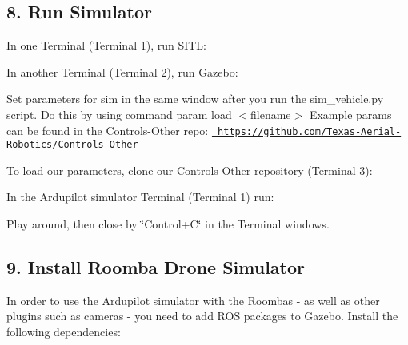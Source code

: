 \subsection*{8. Run Simulator}

In one Terminal (Terminal 1), run S\+I\+TL\+: 
\begin{DoxyCode}{0}
\end{DoxyCode}


In another Terminal (Terminal 2), run Gazebo\+: 
\begin{DoxyCode}{0}
\end{DoxyCode}


Set parameters for sim in the same window after you run the {\ttfamily sim\+\_\+vehicle.\+py script}. Do this by using command {\ttfamily param load $<$filename$>$} Example params can be found in the {\ttfamily Controls-\/\+Other} repo\+: \href{https://github.com/Texas-Aerial-Robotics/Controls-Other}{\texttt{ https\+://github.\+com/\+Texas-\/\+Aerial-\/\+Robotics/\+Controls-\/\+Other}}

To load our parameters, clone our {\ttfamily Controls-\/\+Other} repository (Terminal 3)\+: 
\begin{DoxyCode}{0}
\end{DoxyCode}
 In the Ardupilot simulator Terminal (Terminal 1) run\+: 
\begin{DoxyCode}{0}
\end{DoxyCode}
 Play around, then close by \char`\"{}\+Control+\+C\char`\"{} in the Terminal windows.

\subsection*{9. Install Roomba Drone Simulator}

In order to use the Ardupilot simulator with the Roombas -\/ as well as other plugins such as cameras -\/ you need to add R\+OS packages to Gazebo. Install the following dependencies\+: 
\begin{DoxyCode}{0}
\end{DoxyCode}


